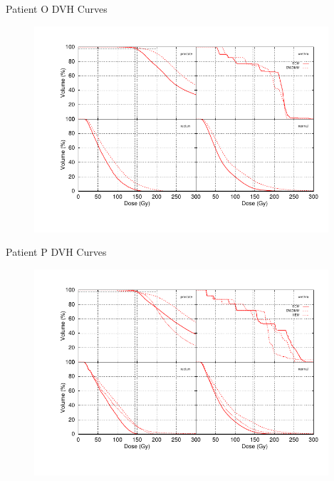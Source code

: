 \documentclass{beamer}
\begin{document}
\begin{frame}{Patient O DVH Curves}
  
  \begin{figure}[h!]
    \begin{center}
      \includegraphics[width=4.3in]{figures/wollenburg_7_31_98-all4x4.pdf}
    \end{center}
  \end{figure}

\end{frame}

\begin{frame}{Patient P DVH Curves}
  
  \begin{figure}[h!]
    \begin{center}
      \includegraphics[width=4.3in]{figures/wray_7_10_98-all4x4.pdf}
    \end{center}
  \end{figure}

\end{frame}
\end{document}
